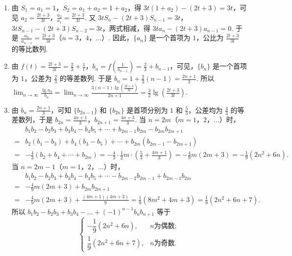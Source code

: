 \begin{solution}
\begin{enumerate}
\item 由 \(S_1=a_1=1\)，\(S_2=a_1+a_2=1+a_2\)，得 \(3t(1+a_2)-(2t+3)=3t\)，可见 \(a_2=\frac{2t+3}{3t}\)，\(\frac{a_2}{a_1}=\frac{2t+3}{3t}\). 又 \(3tS_n-(2t+3)S_{n-1}=3t\)，\(3tS_{n-1}-(2t+3)S_{n-2}=3t\)，两式相减，得 \(3ta_n-(2t+3)a_{n-1}=0\). 于是 \(\frac{a_n}{a_{n-1}}=\frac{2t+3}{3t}\)（\(n=3\)，\(4\)，\(\dots\)）. 因此，\(\{a_n\}\) 是一个首项为 \(1\)，公比为 \(\frac{2t+3}{3t}\) 的等比数列.

\item 由 \(f(t)=\frac{2t+3}{3t}=\frac{2}{3}+\frac{1}{t}\)，\(b_n=f\left(\frac{1}{b_{n-1}}\right)=\frac{2}{3}+b_{n-1}\)，可见，\(\{b_n\}\) 是一个首项为 \(1\)，公差为 \(\frac{2}{3}\) 的等差数列. 于是 \(b_n=1+\frac{2}{3}(n-1)=\frac{2n+1}{3}\). 所以 \(\displaystyle\lim_{n\to\infty}\frac{\lg a_n}{b_n}=\displaystyle\lim_{n\to\infty}\frac{3(n-1)\lg \left(\frac{2t+3}{3t}\right)}{2n+1}=\frac{3}{2}\lg \left(\frac{2t+3}{3t}\right)\).

\item 由 \(b_n=\frac{2n+1}{3}\)，可知 \(\{b_{2n-1}\}\) 和 \(\{b_{2n}\}\) 是首项分别为 \(1\) 和 \(\frac{5}{3}\)，公差均为 \(\frac{4}{3}\) 的等差数列，于是 \(b_{2n}=\frac{4n+1}{3}\)，\(b_{2n+1}=\frac{4n+3}{3}\). 当 \(n=2m\)（\(m=1\)，\(2\)，\(\dots\)）时，
\[
\begin{aligned}
&b_1b_2-b_2b_3+b_3b_4-b_4b_5+\cdots+b_{2m-1}b_{2m}-b_{2m}b_{2m+1} \\
=&b_2(b_1-b_3)+b_4(b_3-b_5)+\cdots+b_{2m}(b_{2m-1}-b_{2m+1}) \\
=&-\frac{4}{3}(b_2+b_4+\cdots+b_{2m})
=-\frac{4}{3} \cdot \frac{1}{2}m \cdot \left(\frac{5}{3}+\frac{4m+1}{3}\right)
=-\frac{4}{9}m(2m+3)=-\frac{1}{9}(2n^2+6n).
\end{aligned}
\]
当 \(n=2m-1\)（\(m=1\)，\(2\)，\(\dots\)）时，
\[
\begin{aligned}
&b_1b_2-b_2b_3+b_3b_4-b_4b_5+\cdots-b_{2m-2}b_{2m-1}+b_{2m-1}b_{2m} \\
=&-\frac{4}{9}m(2m+3)+b_{2m}b_{2m+1} \\
=&-\frac{4}{9}m(2m+3)+\frac{(4m+1)(4m+3)}{9}
=\frac{1}{9}(8m^2+4m+3)=\frac{1}{9}(2n^2+6n+7).
\end{aligned}
\]
所以 \(b_1b_2-b_2b_3+b_3b_4-\dots+(-1)^{n-1}b_nb_{n+1}\) 等于
\[
\begin{cases}
-\dfrac{1}{9}(2n^2+6n), & n \text{为偶数};\\[2mm]
\dfrac{1}{9}(2n^2+6n+7), & n \text{为奇数}.
\end{cases}
\]
\end{enumerate}
\end{solution}
